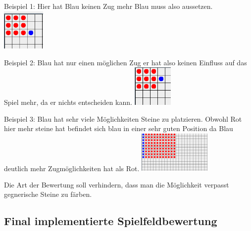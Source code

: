\documentclass[12pt,a4paper,bibliography=totocnumbered,listof=totocnumbered]{scrartcl}
\begin{document}
    Beispiel 1: Hier hat Blau keinen Zug mehr Blau muss also aussetzen.
    \newline
    \includegraphics[height=2cm]{pics/BlauKeinZug}

    Beispiel 2: Blau hat nur einen möglichen Zug er hat also keinen Einfluss auf das Spiel mehr, da er nichts entscheiden kann.
    \newline
    \includegraphics[height=2cm]{pics/BlauEinZug}

    Beispiel 3: Blau hat sehr viele Möglichkeiten Steine zu platzieren. Obwohl Rot hier mehr steine hat befindet sich blau in einer sehr guten Position da Blau deutlich mehr Zugmöglichkeiten hat als Rot.
    \newline
    \includegraphics[height=2cm]{pics/BlauVieleZuege}

    Die Art der Bewertung soll verhindern, dass man die Möglichkeit verpasst gegnerische Steine zu färben.


    \subsection{Final implementierte Spielfeldbewertung}
    \vspace{1em}
\end{document}
